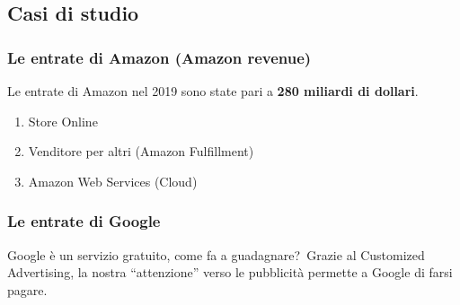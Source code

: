\subsection{Casi di studio}

\subsubsection{Le entrate di Amazon (Amazon revenue)}
Le entrate di Amazon nel 2019  sono state pari a \textbf{280 miliardi di dollari}.\
\begin{enumerate}
    \item Store Online
    \item Venditore per altri (Amazon Fulfillment)
    \item Amazon Web Services (Cloud)
\end{enumerate}

\subsubsection{Le entrate di Google}
Google è un servizio gratuito, come fa a guadagnare?\ Grazie al Customized Advertising, la nostra ``attenzione'' verso le pubblicità permette a Google di farsi pagare.\


